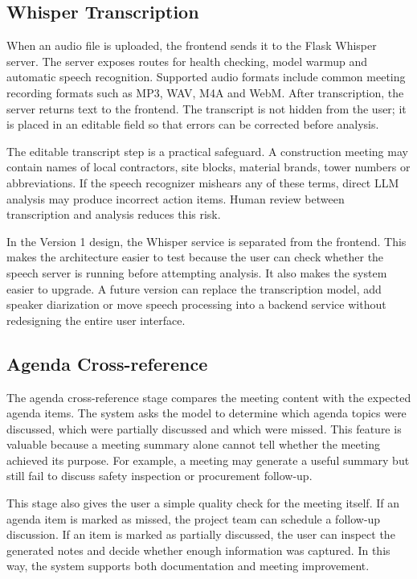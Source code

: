\documentclass[11pt,a4paper]{article}
\begin{document}
\subsection{Whisper Transcription}

When an audio file is uploaded, the frontend sends it to the Flask Whisper server. The server exposes routes for health checking, model warmup and automatic speech recognition. Supported audio formats include common meeting recording formats such as MP3, WAV, M4A and WebM. After transcription, the server returns text to the frontend. The transcript is not hidden from the user; it is placed in an editable field so that errors can be corrected before analysis.

The editable transcript step is a practical safeguard. A construction meeting may contain names of local contractors, site blocks, material brands, tower numbers or abbreviations. If the speech recognizer mishears any of these terms, direct LLM analysis may produce incorrect action items. Human review between transcription and analysis reduces this risk.

In the Version 1 design, the Whisper service is separated from the frontend. This makes the architecture easier to test because the user can check whether the speech server is running before attempting analysis. It also makes the system easier to upgrade. A future version can replace the transcription model, add speaker diarization or move speech processing into a backend service without redesigning the entire user interface.

\subsection{Agenda Cross-reference}

The agenda cross-reference stage compares the meeting content with the expected agenda items. The system asks the model to determine which agenda topics were discussed, which were partially discussed and which were missed. This feature is valuable because a meeting summary alone cannot tell whether the meeting achieved its purpose. For example, a meeting may generate a useful summary but still fail to discuss safety inspection or procurement follow-up.

This stage also gives the user a simple quality check for the meeting itself. If an agenda item is marked as missed, the project team can schedule a follow-up discussion. If an item is marked as partially discussed, the user can inspect the generated notes and decide whether enough information was captured. In this way, the system supports both documentation and meeting improvement.
\end{document}
